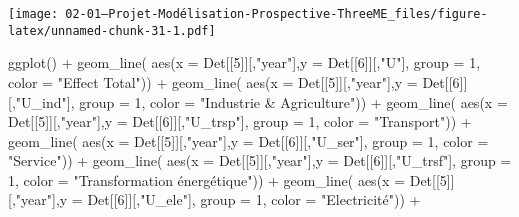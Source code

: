 \documentclass[
]{article}
\newenvironment{Shaded}{\begin{snugshade}}{\end{snugshade}}
\newcommand{\AttributeTok}[1]{\textcolor[rgb]{0.77,0.63,0.00}{#1}}
\newcommand{\DecValTok}[1]{\textcolor[rgb]{0.00,0.00,0.81}{#1}}
\newcommand{\FunctionTok}[1]{\textcolor[rgb]{0.00,0.00,0.00}{#1}}
\newcommand{\NormalTok}[1]{#1}
\newcommand{\SpecialCharTok}[1]{\textcolor[rgb]{0.00,0.00,0.00}{#1}}
\newcommand{\StringTok}[1]{\textcolor[rgb]{0.31,0.60,0.02}{#1}}
\begin{document}
\texttt{[image: 02-01---Projet-Modélisation-Prospective-ThreeME\_files/figure-latex/unnamed-chunk-31-1.pdf]}

\begin{Shaded}
\begin{Highlighting}[]
\FunctionTok{ggplot}\NormalTok{() }\SpecialCharTok{+} 
  \FunctionTok{geom\_line}\NormalTok{( }\FunctionTok{aes}\NormalTok{(}\AttributeTok{x =}\NormalTok{ Det[[}\DecValTok{5}\NormalTok{]][,}\StringTok{"year"}\NormalTok{],}\AttributeTok{y =}\NormalTok{ Det[[}\DecValTok{6}\NormalTok{]][,}\StringTok{"U"}\NormalTok{], }\AttributeTok{group =} \DecValTok{1}\NormalTok{, }\AttributeTok{color =} \StringTok{"Effect Total"}\NormalTok{)) }\SpecialCharTok{+} 
  \FunctionTok{geom\_line}\NormalTok{( }\FunctionTok{aes}\NormalTok{(}\AttributeTok{x =}\NormalTok{ Det[[}\DecValTok{5}\NormalTok{]][,}\StringTok{"year"}\NormalTok{],}\AttributeTok{y =}\NormalTok{ Det[[}\DecValTok{6}\NormalTok{]][,}\StringTok{"U\_ind"}\NormalTok{], }\AttributeTok{group =} \DecValTok{1}\NormalTok{, }\AttributeTok{color =} \StringTok{"Industrie \& Agriculture"}\NormalTok{)) }\SpecialCharTok{+} 
  \FunctionTok{geom\_line}\NormalTok{( }\FunctionTok{aes}\NormalTok{(}\AttributeTok{x =}\NormalTok{ Det[[}\DecValTok{5}\NormalTok{]][,}\StringTok{"year"}\NormalTok{],}\AttributeTok{y =}\NormalTok{ Det[[}\DecValTok{6}\NormalTok{]][,}\StringTok{"U\_trsp"}\NormalTok{], }\AttributeTok{group =} \DecValTok{1}\NormalTok{, }\AttributeTok{color =} \StringTok{"Transport"}\NormalTok{)) }\SpecialCharTok{+} 
  \FunctionTok{geom\_line}\NormalTok{( }\FunctionTok{aes}\NormalTok{(}\AttributeTok{x =}\NormalTok{ Det[[}\DecValTok{5}\NormalTok{]][,}\StringTok{"year"}\NormalTok{],}\AttributeTok{y =}\NormalTok{ Det[[}\DecValTok{6}\NormalTok{]][,}\StringTok{"U\_ser"}\NormalTok{], }\AttributeTok{group =} \DecValTok{1}\NormalTok{, }\AttributeTok{color =} \StringTok{"Service"}\NormalTok{)) }\SpecialCharTok{+} 
  \FunctionTok{geom\_line}\NormalTok{( }\FunctionTok{aes}\NormalTok{(}\AttributeTok{x =}\NormalTok{ Det[[}\DecValTok{5}\NormalTok{]][,}\StringTok{"year"}\NormalTok{],}\AttributeTok{y =}\NormalTok{ Det[[}\DecValTok{6}\NormalTok{]][,}\StringTok{"U\_trsf"}\NormalTok{], }\AttributeTok{group =} \DecValTok{1}\NormalTok{, }\AttributeTok{color =} \StringTok{"Transformation énergétique"}\NormalTok{)) }\SpecialCharTok{+} 
  \FunctionTok{geom\_line}\NormalTok{( }\FunctionTok{aes}\NormalTok{(}\AttributeTok{x =}\NormalTok{ Det[[}\DecValTok{5}\NormalTok{]][,}\StringTok{"year"}\NormalTok{],}\AttributeTok{y =}\NormalTok{ Det[[}\DecValTok{6}\NormalTok{]][,}\StringTok{"U\_ele"}\NormalTok{], }\AttributeTok{group =} \DecValTok{1}\NormalTok{, }\AttributeTok{color =} \StringTok{"Electricité"}\NormalTok{)) }\SpecialCharTok{+}

\end{Highlighting}
\end{Shaded}
\end{document}
